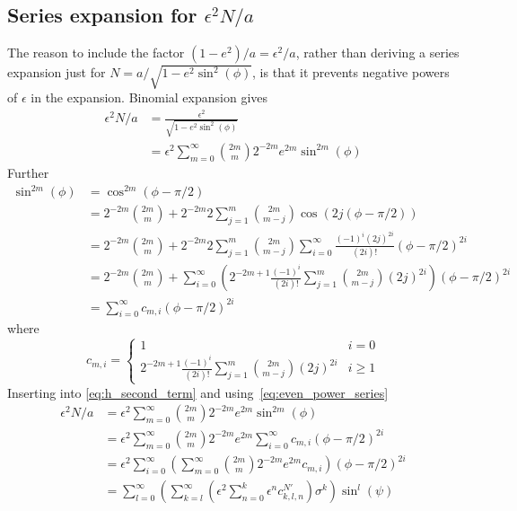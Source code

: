 \documentclass[a4paper]{amsart}
\begin{document}
\subsection{Series expansion for \texorpdfstring{$\epsilon^2N/a$}{ε²N/a}}\label{sec:N_series}
The reason to include the factor $(1-e^2)/a=\epsilon^2/a$, rather than deriving a series expansion just for $N=a/\sqrt{1-e^2\sin^2(\phi)}$, is that it prevents negative powers of $\epsilon$ in the expansion.
Binomial expansion gives
\begin{align}
\nonumber\epsilon^2N/a&=\frac{\epsilon^2}{\sqrt{1-e^{2}\sin^{2}(\phi)}}\\
\label{eq:h_second_term}&=\epsilon^2\sum_{m=0}^{\infty}\binom{2m}{m}2^{-2m}e^{2m}\sin^{2m}(\phi)
\end{align}
Further
\begin{align*}
\sin^{2m}(\phi)&=\cos^{2m}(\phi-\pi/2)\\
&=2^{-2m}\binom{2m}{m}+2^{-2m}2\sum_{j=1}^{m}\binom{2m}{m-j}\cos(2j(\phi-\pi/2))\\
&=2^{-2m}\binom{2m}{m}+2^{-2m}2\sum_{j=1}^{m}\binom{2m}{m-j}\sum_{i=0}^\infty\frac{(-1)^i(2j)^{2i}}{(2i)!}(\phi-\pi/2)^{2i}\\
&=2^{-2m}\binom{2m}{m}+\sum_{i=0}^{\infty}\left(
2^{-2m+1}\frac{(-1)^i}{(2i)!}\sum_{j=1}^{m}\binom{2m}{m-j}(2j)^{2i}
\right) (\phi-\pi/2)^{2i}\\
&=\sum_{i=0}^{\infty}c_{m,i}(\phi-\pi/2)^{2i}
\end{align*}
where
\begin{equation*}
c_{m,i}=
\begin{cases}
1&i=0\\
2^{-2m+1}\frac{(-1)^i}{(2i)!}\sum_{j=1}^{m}\binom{2m}{m-j}(2j)^{2i}&i\geq1
\end{cases}
\end{equation*}
Inserting into \eqref{eq:h_second_term} and using~\eqref{eq:even_power_series}
\begin{align}
\epsilon^2N/a&=\epsilon^2\sum_{m=0}^{\infty}\binom{2m}{m}2^{-2m}e^{2m}\sin^{2m}(\phi)\nonumber\\
&=\epsilon^2\sum_{m=0}^{\infty}\binom{2m}{m}2^{-2m}e^{2m}\sum_{i=0}^{\infty}c_{m,i}(\phi-\pi/2)^{2i}\nonumber\\
&=\epsilon^2\sum_{i=0}^{\infty}\left(\sum_{m=0}^{\infty}\binom{2m}{m}2^{-2m}e^{2m}c_{m,i}\right)(\phi-\pi/2)^{2i}\nonumber\\
&=\sum_{l=0}^\infty\left(\sum_{k=l}^\infty\left(\epsilon^2\sum_{n=0}^k\epsilon^{n}c^{N'}_{k,l,n}\right)\sigma^k\right)\sin^l(\psi)\label{eq:one_over_sqrt_expansion}
\end{align}
\end{document}
